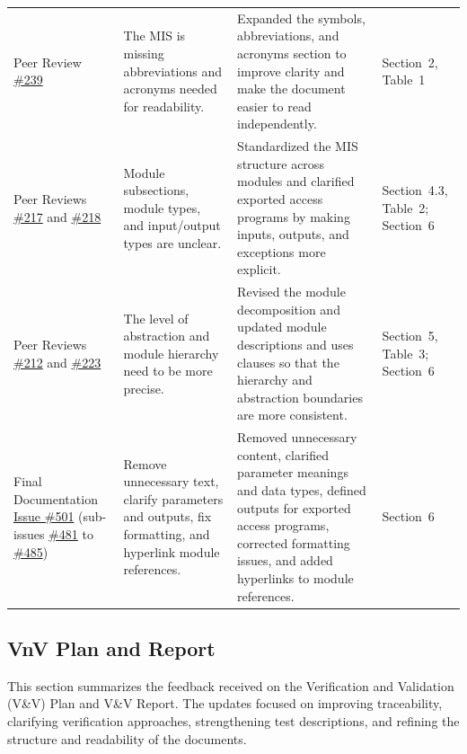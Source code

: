 \documentclass{article}
\begin{document}
\begin{longtable}{p{} p{}
                  p{} p{}}
Peer Review
\href{https://github.com/thaafei/DomainX/issues/239}{\#239}
&
The MIS is missing abbreviations and acronyms needed for readability.
&
Expanded the symbols, abbreviations, and acronyms section to improve
clarity and make the document easier to read independently.
&
Section~2, Table~1
\\

Peer Reviews
\href{https://github.com/thaafei/DomainX/issues/217}{\#217}
and \href{https://github.com/thaafei/DomainX/issues/218}{\#218}
&
Module subsections, module types, and input/output types are unclear.
&
Standardized the MIS structure across modules and clarified exported
access programs by making inputs, outputs, and exceptions more
explicit.
&
Section~4.3, Table~2; Section~6
\\

Peer Reviews
\href{https://github.com/thaafei/DomainX/issues/212}{\#212}
and \href{https://github.com/thaafei/DomainX/issues/223}{\#223}
&
The level of abstraction and module hierarchy need to be more precise.
&
Revised the module decomposition and updated module descriptions and
uses clauses so that the hierarchy and abstraction boundaries are more
consistent.
&
Section~5, Table~3; Section~6
\\

Final Documentation
\href{https://github.com/thaafei/DomainX/issues/501}{Issue \#501}
(sub-issues
\href{https://github.com/thaafei/DomainX/issues/481}{\#481} to
\href{https://github.com/thaafei/DomainX/issues/485}{\#485})
&
Remove unnecessary text, clarify parameters and outputs, fix
formatting, and hyperlink module references.
&
Removed unnecessary content, clarified parameter meanings and data
types, defined outputs for exported access programs, corrected
formatting issues, and added hyperlinks to module references.
&
Section~6
\\

\end{longtable}



\subsection{VnV Plan and Report}
This section summarizes the feedback received on the Verification
and Validation (V\&V) Plan and V\&V Report. The updates focused on
improving traceability, clarifying verification approaches,
strengthening test descriptions, and refining the structure and
readability of the documents.
\end{document}

